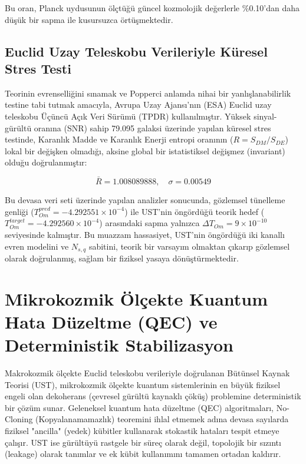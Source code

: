 \documentclass[12pt,a4paper]{article}
\begin{document}
Bu oran, Planck uydusunun ölçtüğü güncel kozmolojik değerlerle \%0.10'dan daha düşük bir sapma ile kusursuzca örtüşmektedir.

\subsection{Euclid Uzay Teleskobu Verileriyle Küresel Stres Testi}
Teorinin evrenselliğini sınamak ve Popperci anlamda nihai bir yanlışlanabilirlik testine tabi tutmak amacıyla, Avrupa Uzay Ajansı'nın (ESA) Euclid uzay teleskobu Üçüncü Açık Veri Sürümü (TPDR) kullanılmıştır. Yüksek sinyal-gürültü oranına (SNR) sahip 79.095 galaksi üzerinde yapılan küresel stres testinde, Karanlık Madde ve Karanlık Enerji entropi oranının ($R = S_{DM} / S_{DE}$) lokal bir değişken olmadığı, aksine global bir istatistiksel değişmez (invariant) olduğu doğrulanmıştır:

\begin{equation}
\bar{R} = 1.008089888, \quad \sigma = 0.00549
\end{equation}

Bu devasa veri seti üzerinde yapılan analizler sonucunda, gözlemsel tünelleme genliği ($T_{Om}^{pred} = -4.292551 \times 10^{-4}$) ile UST'nin öngördüğü teorik hedef ($T_{Om}^{target} = -4.292560 \times 10^{-4}$) arasındaki sapma yalnızca $\Delta T_{Om} = 9 \times 10^{-10}$ seviyesinde kalmıştır. Bu muazzam hassasiyet, UST'nin öngördüğü iki kanallı evren modelini ve $N_{s,q}$ sabitini, teorik bir varsayım olmaktan çıkarıp gözlemsel olarak doğrulanmış, sağlam bir fiziksel yasaya dönüştürmektedir.


\section{Mikrokozmik Ölçekte Kuantum Hata Düzeltme (QEC) ve Deterministik Stabilizasyon}

Makrokozmik ölçekte Euclid teleskobu verileriyle doğrulanan Bütünsel Kaynak Teorisi (UST), mikrokozmik ölçekte kuantum sistemlerinin en büyük fiziksel engeli olan dekoherans (çevresel gürültü kaynaklı çöküş) problemine deterministik bir çözüm sunar. Geleneksel kuantum hata düzeltme (QEC) algoritmaları, No-Cloning (Kopyalanamamazlık) teoremini ihlal etmemek adına devasa sayılarda fiziksel "ancilla" (yedek) kübitler kullanarak stokastik hataları tespit etmeye çalışır. UST ise gürültüyü rastgele bir süreç olarak değil, topolojik bir sızıntı (leakage) olarak tanımlar ve ek kübit kullanımını tamamen ortadan kaldırır.
\end{document}
